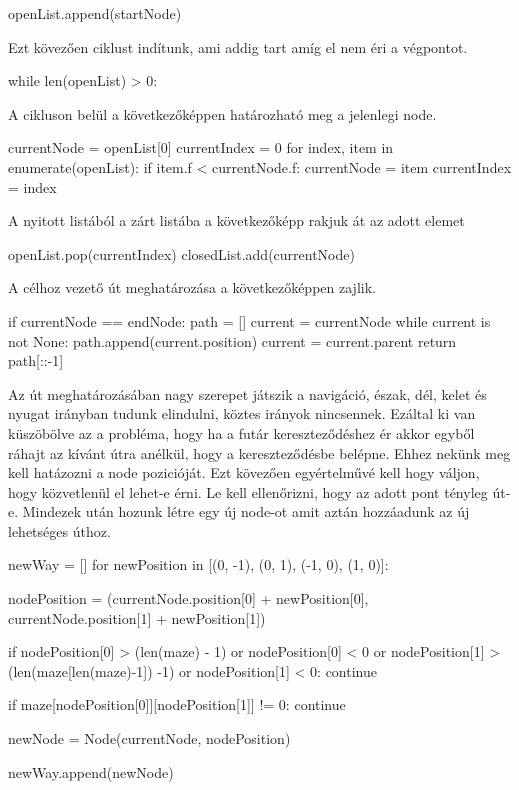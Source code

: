 \begin{python}
openList.append(startNode)
\end{python}

Ezt kövezően ciklust indítunk, ami addig tart amíg el nem éri a végpontot.

\begin{python}
while len(openList) > 0:
\end{python}

A cikluson belül a következőképpen határozható meg a jelenlegi node.

\begin{python}
currentNode = openList[0]
currentIndex = 0
for index, item in enumerate(openList):
       if item.f < currentNode.f:
          currentNode = item
          currentIndex = index
                
\end{python}      

A nyitott listából a zárt listába a következőképp rakjuk át az adott elemet
          
\begin{python}
openList.pop(currentIndex)
closedList.add(currentNode)
\end{python}

A célhoz vezető út meghatározása a következőképpen zajlik.

\begin{python}
if currentNode == endNode:
    path = []
    current = currentNode
    while current is not None:
        path.append(current.position)
        current = current.parent
    return path[::-1]
\end{python}

Az út meghatározásában nagy szerepet játszik a navigáció, észak, dél, kelet és nyugat irányban tudunk elindulni, köztes irányok nincsennek. Ezáltal ki van küszöbölve az a probléma, hogy ha a futár kereszteződéshez ér akkor egyből ráhajt az kívánt útra anélkül, hogy a kereszteződésbe belépne. Ehhez nekünk meg kell hatázozni a node pozicióját. Ezt kövezően egyértelművé kell hogy váljon, hogy közvetlenül el lehet-e érni. Le kell ellenőrizni, hogy az adott pont tényleg út-e. Mindezek után hozunk létre egy új node-ot amit aztán hozzáadunk az új lehetséges úthoz.

\begin{python}
newWay = []                
for newPosition in [(0, -1), (0, 1), (-1, 0), (1, 0)]:

    nodePosition = (currentNode.position[0] + newPosition[0], 
            		currentNode.position[1] + newPosition[1])

    if nodePosition[0] > (len(maze) - 1) or 
    nodePosition[0] < 0 or 
    nodePosition[1] > (len(maze[len(maze)-1]) -1) or 
    nodePosition[1] < 0:
        continue

    if maze[nodePosition[0]][nodePosition[1]] != 0:
        continue

    newNode = Node(currentNode, nodePosition)

    newWay.append(newNode)
\end{python}

